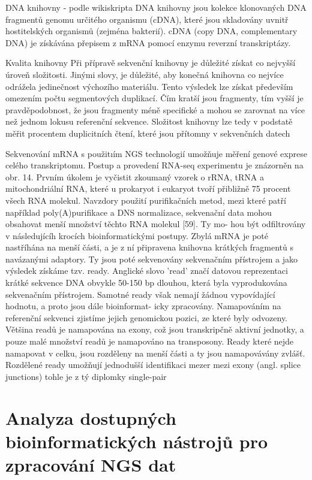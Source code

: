 \documentclass[czech,DP]{thesiskiv}
\numberwithin{equation}{section}
\begin{document}
DNA knihovny - podle wikiskripta
DNA knihovny jsou kolekce klonovaných DNA fragmentů genomu určitého organismu (cDNA), které jsou skladovány uvnitř hostitelských organismů (zejména bakterií). cDNA (copy DNA, complementary DNA) je získávána přepisem z mRNA pomocí enzymu reverzní transkriptázy.

Kvalita knihovny
Při přípravě sekvenční knihovny je důležité získat co nejvyšší úroveň složitosti. Jinými slovy, je důležité, aby konečná knihovna co nejvíce odrážela jedinečnost výchozího materiálu. Tento výsledek lze získat především omezením počtu segmentových duplikací. Čím kratší jsou fragmenty, tím vyšší je pravděpodobnost, že jsou fragmenty méně specifické a mohou se zarovnat na více než jednom lokusu referenční sekvence. Složitost knihovny lze tedy v podstatě měřit procentem duplicitních čtení, které jsou přítomny v sekvenčních datech

Sekvenování mRNA s použitıím NGS technologií umožňuje měření genové exprese celého
transkriptomu. Postup a provedení RNA-seq experimentu je znázorněn na obr. 14.
Prvním úkolem je vyčistit zkoumaný vzorek o rRNA, tRNA a mitochondriální RNA,
které u prokaryot i eukaryot tvoří přibližně 75 procent všech RNA molekul. Navzdory použití
purifikačních metod, mezi které patří například poly(A)purifikace a DNS normalizace,
sekvenační data mohou obsahovat menší množství těchto RNA molekul [59]. Ty mo-
hou být odfiltrovány v následujícíh krocích bioinformatickými postupy. Zbylá mRNA
je poté nastříhána na menší části, a je z ní připravena knihovna krátkých fragmentů s
navázanými adaptory. Ty jsou poté sekvenovány sekvenačním přístrojem a jako výsledek
získáme tzv. ready. Anglické slovo ’read’ značí datovou reprezentaci krátké sekvence
DNA obvykle 50-150 bp dlouhou, která byla vyprodukována sekvenačním přístrojem.
Samotné ready však nemají žádnou vypovídající hodnotu, a proto jsou dále bioinformat-
icky zpracovány. Namapováním na referenční sekvenci zjistíme jejich genomickou pozici,
ze které byly odvozeny. Většina readů je namapována na exony, což jsou transkripčně
aktivní jednotky, a pouze malé množství readů je namapováno na transposony. Ready
které nejde namapovat v celku, jsou rozděleny na menší části a ty jsou namapovávány
zvlášť. Rozdělené ready umožňují jednodušší identifikaci mezer mezi exony (angl. splice
junctions)
tohle je z tý diplomky single-pair

\chapter{Analyza dostupných bioinformatických nástrojů pro zpracování NGS dat}
\end{document}
